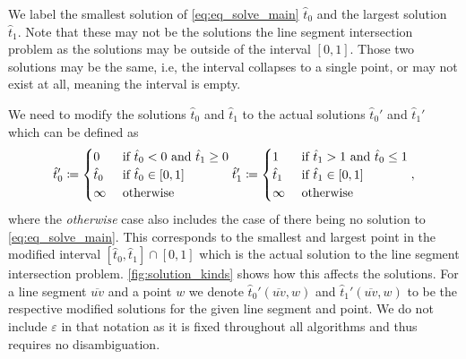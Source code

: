 We label the smallest solution of \cref{eq:eq_solve_main} \(\hat{t}_0\) and the largest solution \(\hat{t}_1\). Note that these may not be the solutions the line segment intersection problem as the solutions may be outside of the interval \([0, 1]\). Those two solutions may be the same, i.e, the interval collapses to a single point, or may not exist at all, meaning the interval is empty.

We need to modify the solutions \(\hat{t}_0\) and \(\hat{t}_1\) to the actual solutions \(\hat{t}_0'\) and \(\hat{t}_1'\) which can be defined as 
\begin{equation}
  \hat{t}_0' \coloneq \begin{cases}
    0 & \textrm{ if } \hat{t}_0 < 0 \textrm{ and } \hat{t}_1 \geq 0\\
    \hat{t}_0 & \textrm{ if } \hat{t}_0 \in [0, 1]\\
    \infty &\textrm{ otherwise }
  \end{cases}\\
  \hat{t}_1' \coloneq \begin{cases}
    1 & \textrm{ if } \hat{t}_1 > 1 \textrm{ and } \hat{t}_0 \leq 1\\
    \hat{t}_1 & \textrm{ if } \hat{t}_1 \in [0, 1]\\

    \infty &\textrm{ otherwise }
  \end{cases},
\end{equation}
where the \emph{otherwise} case also includes the case of there being no solution to \cref{eq:eq_solve_main}. This corresponds to the smallest and largest point in the modified interval \([\hat t_0, \hat t_1] \cap [0, 1]\) which is the actual solution to the line segment intersection problem. \cref{fig:solution_kinds} shows how this affects the solutions.
For a line segment \(\overline{uv}\) and a point \(w\) we denote \(\hat t_0'(\overline{uv}, w)\) and \(\hat t_1'(\overline{uv}, w)\) to be the respective modified solutions for the given line segment and point. We do not include \(\varepsilon\) in that notation as it is fixed throughout all algorithms and thus requires no disambiguation.


